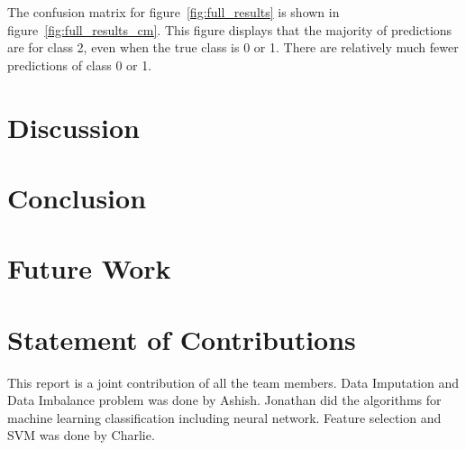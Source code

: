 \documentclass[conference]{IEEEtran}
\begin{document}
The confusion matrix for figure~\ref{fig:full_results} is shown in figure~\ref{fig:full_results_cm}. This figure displays that the majority of predictions are for class 2, even when the true class is 0 or 1. There are relatively much fewer predictions of class 0 or 1.

\section{Discussion}

\section{Conclusion}

\section{Future Work}



%


\appendices
\section{Statement of Contributions}
This report is a joint contribution of all the team members. Data Imputation and Data Imbalance problem was done by Ashish. Jonathan did the algorithms for machine learning classification including neural network. Feature selection and SVM was done by Charlie.
\end{document}
